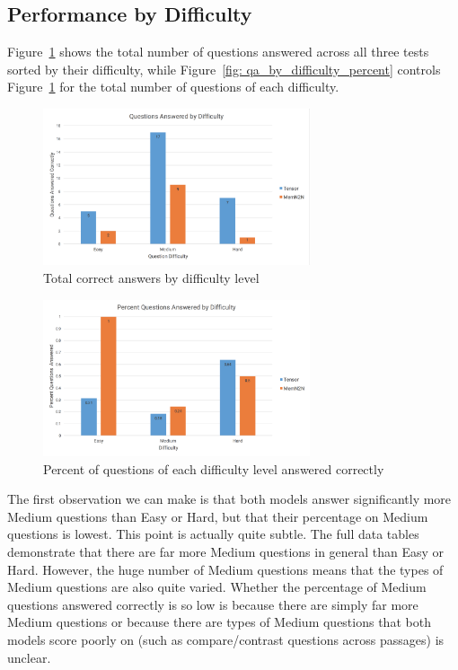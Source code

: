 \documentclass[pageno]{final_paper}
\begin{document}
\subsection{Performance by Difficulty}
\label{Performance by Difficulty}

Figure~\ref{fig: qa_by_difficulty} shows the total number of questions answered
across all three tests sorted by their difficulty, while Figure~\ref{fig:
qa_by_difficulty_percent} controls Figure~\ref{fig: qa_by_difficulty} for the
total number of questions of each difficulty.

\begin{figure}[!tb]
    \centering
    \includegraphics[width=0.7\textwidth,keepaspectratio]{figures/qa_by_difficulty.png}
    \caption{Total correct answers by difficulty level}
    \label{fig: qa_by_difficulty}
\end{figure}

\begin{figure}[!tb]
    \centering
    \includegraphics[width=0.7\textwidth,keepaspectratio]{figures/qa_by_difficulty_percent.png}
    \caption{Percent of questions of each difficulty level answered correctly}
    \label{fig: qa_by_difficulty_percent}
\end{figure}

The first observation we can make is that both models answer significantly more
Medium questions than Easy or Hard, but that their percentage on Medium
questions is lowest. This point is actually quite subtle. The full data tables
demonstrate that there are far more Medium questions in general than Easy or
Hard. However, the huge number of Medium questions means that the types of
Medium questions are also quite varied. Whether the percentage of Medium
questions answered correctly is so low is because there are simply far more
Medium questions or because there are types of Medium questions that both models
score poorly on (such as compare/contrast questions across passages) is unclear.
\end{document}
